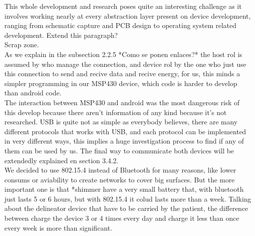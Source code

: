 

	This whole development and research poses quite an interesting challenge as it involves working nearly at every abstraction layer present on device development, ranging from schematic capture and PCB design to operating system related development.
	Extend this paragraph?\\
	
	Scrap zone.\\


	As we explain in the subsection 2.2.5 *Como se ponen enlaces?* the host rol is assumed by who manage the connection, and device rol by the one who just use this connection to send and recive data and recive energy, for us, this minds a simpler programming in our MSP430 device, which code is harder to develop than android code.\\

	The interaction between MSP430 and android was the most dangerous risk of this develop because there aren't information of any kind because it's not researched. USB is quite not as simple as everybody believes, there are many different protocols that works with USB, and each protocol can be implemented in very different ways, this implies a huge investigation process to find if any of them can be used by us. The final way to communicate both devices will be extendedly explained en section 3.4.2.\\

	We decided to use 802.15.4 instead of Bluetooth for many reasons, like lower consums or aviability to create networks to cover big surfaces. But the more important one is that *shimmer have a very small battery that, with bluetooth just lasts 5 or 6 hours, but with 802.15.4 it colud lasts more than a week. Talking about the delineator device that have to be carried by the patient, the difference between charge the device 3 or 4 times every day and charge it less than once every week is more than significant.\\

